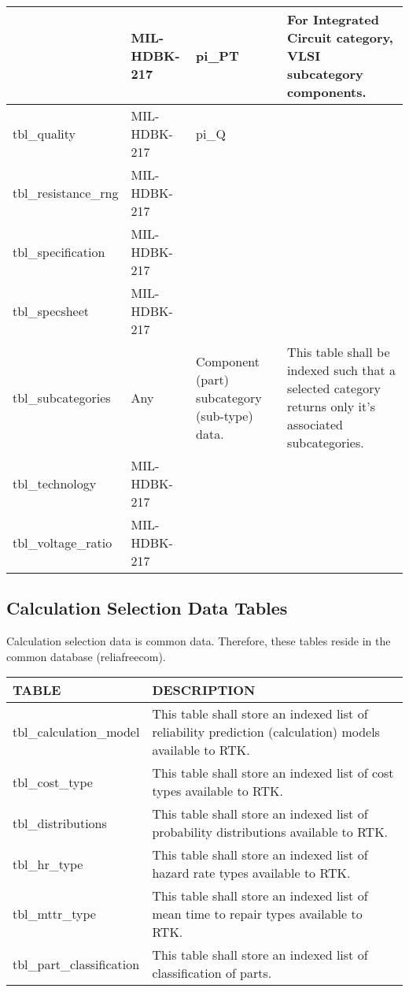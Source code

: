 \documentclass[11pt, 12pt, twoside, onecolumn]{article}
\begin{document}
\begin{landscape}
\begin{tabular}{p{2.0in} | m{1.5in} | m{1.5in} | p{3.75in}}
    & MIL-HDBK-217 & pi\_PT & For Integrated Circuit category, VLSI subcategory components. \\ \hline
    tbl\_quality & MIL-HDBK-217 & pi\_Q & \\ \hline
    tbl\_resistance\_rng & MIL-HDBK-217 & & \\ \hline
    tbl\_specification & MIL-HDBK-217 & & \\ \hline
    tbl\_specsheet & MIL-HDBK-217 & & \\ \hline
    tbl\_subcategories & Any & Component (part) subcategory (sub-type) data. & This table shall be indexed such that a selected category returns only it's associated subcategories. \\ \hline
    tbl\_technology & MIL-HDBK-217 & & \\ \hline
    tbl\_voltage\_ratio & MIL-HDBK-217 & & \\ \hline
    \hline
    \end{tabular}
    \end{landscape}

\subsection{\bf \large Calculation Selection Data Tables}

\noindent Calculation selection data is common data.  Therefore, these tables reside in the common database (reliafreecom). \\

    \begin{landscape}
    \begin{longtable}{ll}
    TABLE & DESCRIPTION \\
    \hline
    tbl\_calculation\_model & This table shall store an indexed list of reliability prediction (calculation) models available to RTK. \\
    tbl\_cost\_type & This table shall store an indexed list of cost types available to RTK. \\
    tbl\_distributions & This table shall store an indexed list of probability distributions available to RTK. \\
    tbl\_hr\_type & This table shall store an indexed list of hazard rate types available to RTK. \\
    tbl\_mttr\_type & This table shall store an indexed list of mean time to repair types available to RTK. \\
    tbl\_part\_classification & This table shall store an indexed list of classification of parts. \\
    \hline
    \end{longtable}
    \end{landscape}
\end{document}
